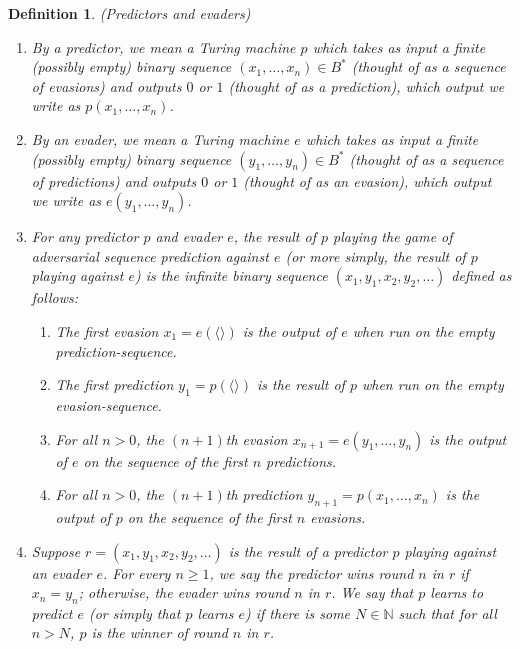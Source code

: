 \documentclass{article}
\newtheorem{definition}[theorem]{Definition}
\begin{document}
\begin{definition}
\label{evaderpredictordefn}
    (Predictors and evaders)
    \begin{enumerate}
        \item
        By a \emph{predictor}, we mean a Turing machine $p$
        which takes as input a finite (possibly empty) binary sequence
        $(x_1,\ldots,x_n)\in B^*$
        (thought of as a sequence of \emph{evasions})
        and outputs $0$ or $1$ (thought of as a \emph{prediction}), which output
        we write as $p(x_1,\ldots,x_n)$.
        \item
        By an \emph{evader}, we mean a Turing machine $e$
        which takes as input a finite (possibly empty) binary sequence
        $(y_1,\ldots,y_n)\in B^*$
        (thought of as a sequence of \emph{predictions})
        and outputs $0$ or $1$ (thought of as an \emph{evasion}), which output
        we write as $e(y_1,\ldots,y_n)$.
        \item
        For any predictor $p$ and evader $e$, the \emph{result of $p$ playing the
        game of adversarial sequence
        prediction against $e$} (or more simply, the \emph{result of
        $p$ playing against $e$}) is the infinite binary sequence
        $(x_1,y_1,x_2,y_2,\ldots)$
        defined as follows:
        \begin{enumerate}
            \item
            The first evasion
            $x_1=e(\langle\rangle)$ is
            the output of $e$ when run on the empty prediction-sequence.
            \item
            The first prediction
            $y_1=p(\langle\rangle)$ is
            the result of $p$ when run on the empty evasion-sequence.
            \item
            For all $n>0$, the $(n+1)$th evasion
            $x_{n+1}=e(y_1,\ldots,y_n)$ is
            the output of $e$ on the sequence of the first $n$ predictions.
            \item
            For all $n>0$, the $(n+1)$th prediction
            $y_{n+1}=p(x_1,\ldots,x_n)$ is
            the output of $p$ on the sequence of the first $n$ evasions.
        \end{enumerate}
        \item
        Suppose $r=(x_1,y_1,x_2,y_2,\ldots)$ is the result of a predictor $p$ playing
        against an evader $e$. For every $n\geq 1$,
        we say \emph{the predictor wins round $n$ in $r$}
        if $x_n=y_n$; otherwise,
        \emph{the evader wins round $n$ in $r$}.
        We say that \emph{$p$ learns to predict $e$}
        (or simply that \emph{$p$ learns $e$}) if there is some $N\in\mathbb N$
        such that for all $n>N$, $p$ is the winner of round $n$ in $r$.
    \end{enumerate}
\end{definition}
\end{document}
